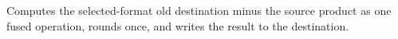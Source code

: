 Computes the selected-format old destination minus the source product as one fused operation, rounds once, and writes the result to the destination.
